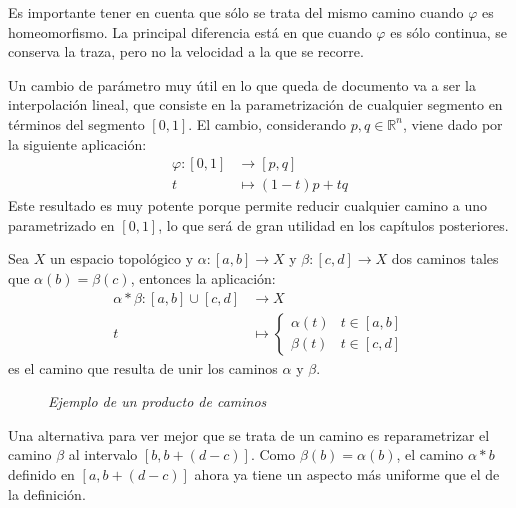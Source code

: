 \begin{obs}
Es importante tener en cuenta que sólo se trata del mismo camino cuando $\varphi$ es homeomorfismo. La principal diferencia está en que cuando $\varphi$ es sólo continua, se conserva la traza, pero no la velocidad a la que se recorre.
\end{obs}

\begin{ej}
Un cambio de parámetro muy útil en lo que queda de documento va a ser la interpolación lineal, que consiste en la parametrización de cualquier segmento en términos del segmento $[0,1]$. El cambio, considerando $p, q\in \mathbb{R}^n$, viene dado por la siguiente aplicación:
\begin{align*}
\varphi : [0, 1] &\longrightarrow [p, q] \\
			t & \longmapsto (1-t)p + tq
\end{align*}
Este resultado es muy potente porque permite reducir cualquier camino a uno parametrizado en $[0,1]$, lo que será de gran utilidad en los capítulos posteriores.
\end{ej}

\begin{defi}
Sea $X$ un espacio topológico y $\alpha : [a,b]\rightarrow X$ y $\beta:[c,d]\rightarrow X$ dos caminos tales que $\alpha(b) = \beta(c)$, entonces la aplicación:
\begin{align*}
\alpha \ast \beta : [a,b] \cup [c,d] &\longrightarrow X \\
						t &\longmapsto \begin{cases}
										\alpha(t) & t \in [a,b] \\
										\beta(t) & t\in [c,d]
										\end{cases}	
\end{align*}
es el camino que resulta de unir los caminos $\alpha$ y $\beta$.
\begin{figure}[H]
    \centering
    \caption{\textit{Ejemplo de un producto de caminos}}
    \label{fig:producto-de-caminos}
\end{figure}
\end{defi}

\begin{obs}
Una alternativa para ver mejor que se trata de un camino es reparametrizar el camino $\beta$ al intervalo $[b,b+(d-c)]$. Como $\beta(b) = \alpha(b)$, el camino $\alpha \ast b$ definido en $[a,b+(d-c)]$ ahora ya tiene un aspecto más uniforme que el de la definición.
\end{obs}

